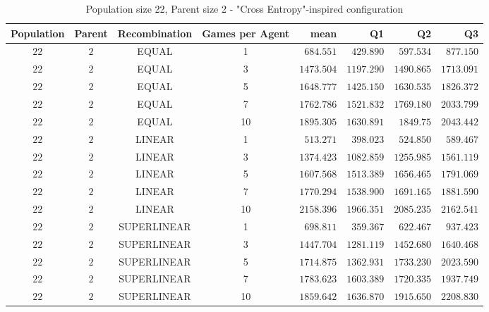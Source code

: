 \begin{table}[H]
\centering
\small
\begin{tabular}{c c c c r r r r}
Population & Parent & Recombination & Games per Agent & mean & Q1 & Q2 & Q3\\
\hline
$22$ & $2$ & EQUAL & 1 & $684.551$ & $429.890$ & $597.534$ & $877.150$\\
$22$ & $2$ & EQUAL & 3 & $1473.504$ & $1197.290$ & $1490.865$ & $1713.091$\\
$22$ & $2$ & EQUAL & 5 & $1648.777$ & $1425.150$ & $1630.535$ & $1826.372$\\
$22$ & $2$ & EQUAL & 7 & $1762.786$ & $1521.832$ & $1769.180$ & $2033.799$\\
\hdashline
$22$ & $2$ & EQUAL & 10 & $1895.305$ & $1630.891$ & $1849.75$ & $2043.442$\\
\hdashline
$22$ & $2$ & LINEAR & 1 & $513.271$ & $398.023$ & $524.850$ & $589.467$\\
$22$ & $2$ & LINEAR & 3 & $1374.423$ & $1082.859$ & $1255.985$ & $1561.119$\\
$22$ & $2$ & LINEAR & 5 & $1607.568$ & $1513.389$ & $1656.465$ & $1791.069$\\
$22$ & $2$ & LINEAR & 7 & $1770.294$ & $1538.900$ & $1691.165$ & $1881.590$\\
\hdashline
$22$ & $2$ & LINEAR & 10 & $2158.396$ & $1966.351$ & $2085.235$ & $2162.541$\\
\hdashline
$22$ & $2$ & SUPERLINEAR & 1 & $698.811$ & $359.367$ & $622.467$ & $937.423$\\
$22$ & $2$ & SUPERLINEAR & 3 & $1447.704$ & $1281.119$ & $1452.680$ & $1640.468$\\
$22$ & $2$ & SUPERLINEAR & 5 & $1714.875$ & $1362.931$ & $1733.230$ & $2023.590$\\
\hdashline
$22$ & $2$ & SUPERLINEAR & 7 & $1783.623$ & $1603.389$ & $1720.335$ & $1937.749$\\
\hdashline
$22$ & $2$ & SUPERLINEAR & 10 & $1859.642$ & $1636.870$ & $1915.650$ & $2208.830$\\
\end{tabular}
\caption{Population size 22, Parent size 2 - "Cross Entropy"-inspired configuration}
\end{table}


